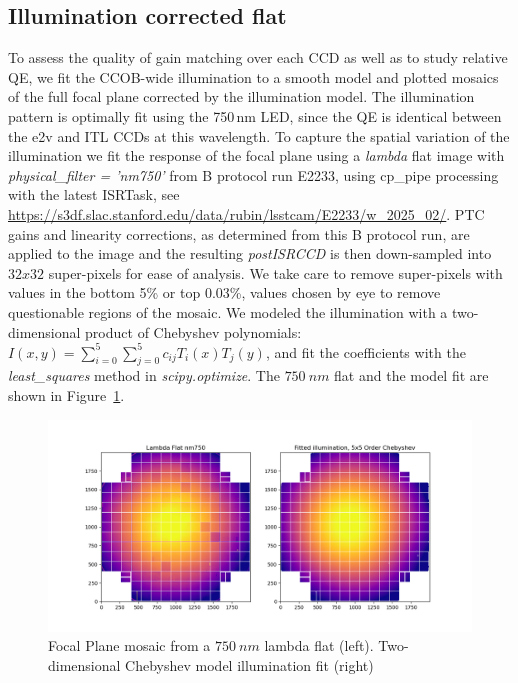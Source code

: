 \clearpage
\subsection{Illumination corrected flat}

To assess the quality of gain matching over each CCD as well as to study relative QE, we fit the CCOB-wide illumination to a smooth model and plotted mosaics of the full focal plane corrected by the illumination model. The illumination pattern is optimally fit using the 750\,nm LED, since the QE is identical between the e2v and ITL CCDs at this wavelength. To capture the spatial variation of the illumination we fit the response of the focal plane using a {\it lambda} flat image with {\it physical\_filter = 'nm750'} from B protocol run E2233, using cp\_pipe processing with the latest ISRTask, see  \url{https://s3df.slac.stanford.edu/data/rubin/lsstcam/E2233/w_2025_02/}. PTC gains and linearity corrections, as determined from this B protocol run, are applied to the image and the resulting {\it postISRCCD} is then down-sampled into $32x32$ super-pixels for ease of analysis. We take care to remove super-pixels with values in the bottom 5\% or top 0.03\%, values chosen by eye to remove questionable regions of the mosaic.  We modeled the illumination with a two-dimensional product of Chebyshev polynomials: $ I(x,y) = \sum_{i=0}^{5} \sum_{j=0}^{5} c_{ij} T_i(x) T_j(y)$, and fit the coefficients with the {\it least\_squares} method in {\it scipy.optimize}.  The $750~nm$ flat and the model fit are shown in Figure~\ref{fig:mosaic-modelfit}.

\begin{figure}[ht]
    \centering
    \includegraphics[width=0.95\linewidth]{figures/lambda_nm750_withfit.png}
    \caption{Focal Plane mosaic from a $750~nm$ lambda flat (left). Two-dimensional Chebyshev model illumination fit (right)}
    \label{fig:mosaic-modelfit}
\end{figure}

